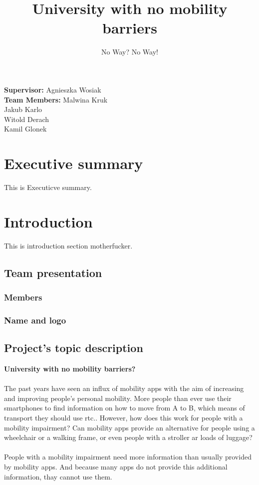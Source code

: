 \documentclass[12pt,letterpaper]{article}
\begin{document}
\title{University with no mobility barriers}
\author{No Way? No Way!}
\maketitle

\begin{flushright}
\vspace*{\fill}
\textbf{Supervisor:} Agnieszka Wosiak\\
\textbf{Team Members:} Malwina Kruk\\ Jakub Karlo\\ Witold Derach\\ Kamil Glonek
\end{flushright}

\newpage

\renewcommand*\contentsname{Table of contents}
\tableofcontents

\newpage


\section{Executive summary}
This is Executicve summary.

\section{Introduction}
This is introduction section motherfucker.

\subsection{Team presentation}

\subsubsection{Members}

\subsubsection{Name and logo}

\subsection{Project's topic description}
\textbf{University with no mobility barriers?} \\\\
The past years have seen an influx of mobility apps with the aim of increasing and improving people's personal mobility. More people than ever use their smartphones to find information on how to move from A to B, which means of transport they should use rtc.. However, how does this work for people with a mobility impairment? Can mobility apps provide an alternative for people using a wheelchair or a walking frame, or even people with a stroller ar loads of luggage?\\\\
People with a mobility impairment need more information than usually provided by mobility apps. And because many apps do not provide this additional information, thay cannot use them.
\end{document}
